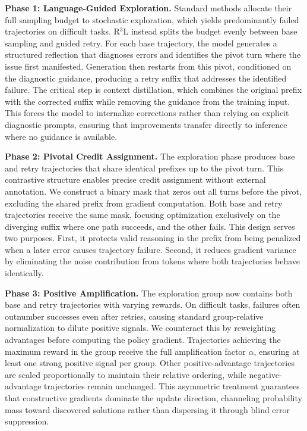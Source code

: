 \documentclass{article} %
\theoremstyle{definition}
\theoremstyle{remark}
\begin{document}
\textbf{Phase 1: Language-Guided Exploration.} Standard methods allocate their full sampling budget to stochastic exploration, which yields predominantly failed trajectories on difficult tasks. R$^3$L instead splits the budget evenly between base sampling and guided retry. For each base trajectory, the model generates a structured reflection that diagnoses errors and identifies the pivot turn where the issue first manifested. Generation then restarts from this pivot, conditioned on the diagnostic guidance, producing a retry suffix that addresses the identified failure. The critical step is context distillation, which combines the original prefix with the corrected suffix while removing the guidance from the training input. This forces the model to internalize corrections rather than relying on explicit diagnostic prompts, ensuring that improvements transfer directly to inference where no guidance is available.

\textbf{Phase 2: Pivotal Credit Assignment.} The exploration phase produces base and retry trajectories that share identical prefixes up to the pivot turn. This contrastive structure enables precise credit assignment without external annotation. We construct a binary mask that zeros out all turns before the pivot, excluding the shared prefix from gradient computation. Both base and retry trajectories receive the same mask, focusing optimization exclusively on the diverging suffix where one path succeeds, and the other fails. This design serves two purposes. First, it protects valid reasoning in the prefix from being penalized when a later error causes trajectory failure. Second, it reduces gradient variance by eliminating the noise contribution from tokens where both trajectories behave identically.

\textbf{Phase 3: Positive Amplification.} The exploration group now contains both base and retry trajectories with varying rewards. On difficult tasks, failures often outnumber successes even after retries, causing standard group-relative normalization to dilute positive signals. We counteract this by reweighting advantages before computing the policy gradient. Trajectories achieving the maximum reward in the group receive the full amplification factor $\alpha$, ensuring at least one strong positive signal per group. Other positive-advantage trajectories are scaled proportionally to maintain their relative ordering, while negative-advantage trajectories remain unchanged. This asymmetric treatment guarantees that constructive gradients dominate the update direction, channeling probability mass toward discovered solutions rather than dispersing it through blind error suppression.
\end{document}
